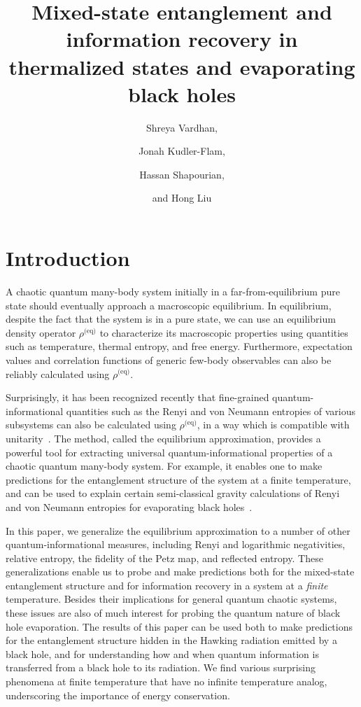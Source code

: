 \documentclass[a4paper,11pt]{article}
\title{\boldmath Mixed-state entanglement and information recovery in thermalized states and evaporating black holes}
\author[a, *]{Shreya Vardhan,}
\author[b, *]{Jonah Kudler-Flam,}
\author[c]{Hassan Shapourian,}
\author[a]{and Hong Liu}
\affiliation[a]{Center for Theoretical Physics, 
Massachusetts Institute of Technology, Cambridge, MA 02139 }
\affiliation[b]{Kadanoff Center for Theoretical Physics,
University of Chicago, Chicago, IL 60637 }
\affiliation[c]{Microsoft Station Q, 
Santa Barbara, CA 93109
 }
\begin{document}
\maketitle



\newpage

\section{Introduction} 


A chaotic quantum many-body system initially in a far-from-equilibrium pure state should eventually 
approach a macroscopic equilibrium. In equilibrium, despite the fact that the system is in a pure state, we can use 
an equilibrium density operator $\rho^{\text{(eq)}}$ to characterize its macroscopic properties using quantities such as 
 temperature, thermal entropy, and free energy. Furthermore, expectation values and correlation functions of generic few-body observables can also be reliably calculated using $\rho^{\text{(eq)}}$. 
 
 
 Surprisingly, it has been recognized recently that fine-grained quantum-informational quantities such as the Renyi and von Neumann entropies of various subsystems can also be calculated using $\rho^{\text{(eq)}}$, in a way which is compatible with unitarity~\cite{2020arXiv200801089L}. The method, called the equilibrium approximation, provides a powerful tool for extracting universal quantum-informational properties of a chaotic quantum many-body system. For example, it enables one to make predictions for the entanglement structure of the system at a finite temperature, and can be used to explain certain semi-classical gravity calculations of Renyi and von Neumann entropies for evaporating black holes~\cite{2020JHEP...09..002P, 2019JHEP...12..063A, 2019arXiv191111977P, 2020JHEP...05..013A}. 
 


In this paper, we generalize the equilibrium approximation to a number of other quantum-informational measures, including 
 Renyi and logarithmic negativities, relative entropy, the fidelity of the Petz map, and reflected entropy. These generalizations 
 enable us to probe and make predictions both for the mixed-state entanglement structure and for information recovery in a system at a {\it finite} temperature. Besides their implications for general quantum chaotic systems, these issues are also of much interest for probing the quantum nature of black hole evaporation. The results of this paper can be used both to make predictions for the entanglement structure hidden in the Hawking radiation emitted by a black hole, and for understanding how and when quantum information is transferred from a black hole to its radiation. We find various surprising phenomena at finite temperature that have no infinite temperature analog, underscoring the importance of energy conservation.
 
\end{document}
